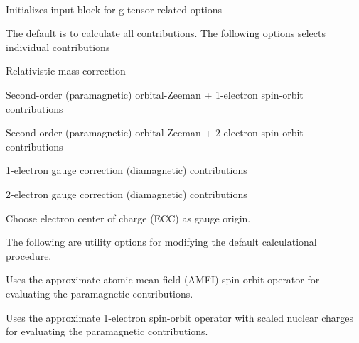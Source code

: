 \begin{description}
  \item{} \\
   Initializes input block for g-tensor related options
\end{description}
The default is to calculate all contributions. The following
options selects individual contributions
\begin{description}
   \item{}
   Relativistic mass correction
   \item{}
   Second-order (paramagnetic) orbital-Zeeman + 1-electron spin-orbit contributions
   \item{}
   Second-order (paramagnetic) orbital-Zeeman + 2-electron spin-orbit contributions
   \item{}
   1-electron gauge correction (diamagnetic) contributions
   \item{}
   2-electron gauge correction (diamagnetic) contributions
   \item{}
   Choose electron center of charge (ECC) as gauge origin.
\end{description}
The following are utility options for modifying the default calculational
procedure.
\begin{description}
   \item{}
   Uses the approximate atomic mean field (AMFI) spin-orbit operator
   for evaluating the paramagnetic contributions.
   \item{}
   Uses the approximate 1-electron spin-orbit operator with scaled nuclear
   charges for evaluating the paramagnetic contributions.
\end{description}


